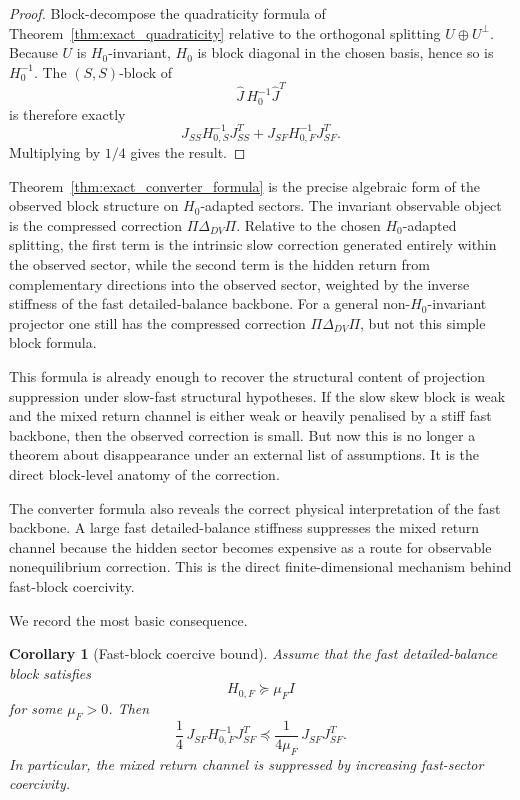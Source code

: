\documentclass[11pt,a4paper]{article}
\numberwithin{equation}{section}
\theoremstyle{thmcompact}
\newtheorem{corollary}[theorem]{Corollary}
\theoremstyle{remark}
\begin{document}
\begin{proof}
Block-decompose the quadraticity formula of Theorem~\ref{thm:exact_quadraticity} relative to the orthogonal splitting \(U\oplus U^\perp\). Because \(U\) is \(H_0\)-invariant, \(H_0\) is block diagonal in the chosen basis, hence so is \(H_0^{-1}\). The \((S,S)\)-block of
\begin{equation}
\widehat J\,H_0^{-1}\widehat J^{T}
\end{equation}
is therefore exactly
\begin{equation}
J_{SS}H_{0,S}^{-1}J_{SS}^{T}
+
J_{SF}H_{0,F}^{-1}J_{SF}^{T}.
\end{equation}
Multiplying by \(1/4\) gives the result.
\end{proof}

Theorem~\ref{thm:exact_converter_formula} is the precise algebraic form of the observed block structure on \(H_0\)-adapted sectors. The invariant observable object is the compressed correction \(\Pi\Delta_{DV}\Pi\). Relative to the chosen \(H_0\)-adapted splitting, the first term is the intrinsic slow correction generated entirely within the observed sector, while the second term is the hidden return from complementary directions into the observed sector, weighted by the inverse stiffness of the fast detailed-balance backbone. For a general non-\(H_0\)-invariant projector one still has the compressed correction \(\Pi\Delta_{DV}\Pi\), but not this simple block formula.

This formula is already enough to recover the structural content of projection suppression under slow-fast structural hypotheses. If the slow skew block is weak and the mixed return channel is either weak or heavily penalised by a stiff fast backbone, then the observed correction is small. But now this is no longer a theorem about disappearance under an external list of assumptions. It is the direct block-level anatomy of the correction.

The converter formula also reveals the correct physical interpretation of the fast backbone. A large fast detailed-balance stiffness suppresses the mixed return channel because the hidden sector becomes expensive as a route for observable nonequilibrium correction. This is the direct finite-dimensional mechanism behind fast-block coercivity.

We record the most basic consequence.

\begin{corollary}[Fast-block coercive bound]
\label{cor:fast_block_coercive_bound}
Assume that the fast detailed-balance block satisfies
\begin{equation}
H_{0,F}\succeq \mu_F I
\end{equation}
for some \(\mu_F>0\). Then
\begin{equation}
\frac14\,J_{SF}H_{0,F}^{-1}J_{SF}^{T}
\preceq
\frac{1}{4\mu_F}\,J_{SF}J_{SF}^{T}.
\end{equation}
In particular, the mixed return channel is suppressed by increasing fast-sector coercivity.
\end{corollary}
\end{document}
